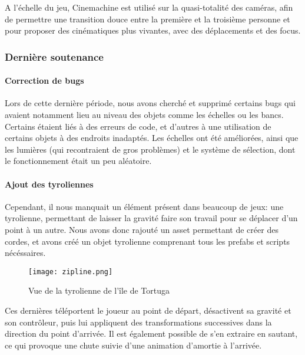 			A l'échelle du jeu, Cinemachine est utilisé sur la quasi-totalité des caméras, 
			afin de permettre une transition douce entre la première et la troisième personne et pour 
			proposer des cinématiques plus vivantes, avec des déplacements et des focus.


	\vspace{0.5cm}
	\subsubsection{Dernière soutenance}
	\vspace{0.5cm}

		\paragraph{Correction de bugs}
			
			Lors de cette dernière période, nous avons cherché et supprimé certains bugs qui avaient notamment lieu au niveau des objets comme les échelles ou les bancs. 
			Certains étaient liés à des erreurs de code, et d'autres à une utilisation de certains objets à des endroits inadaptés.
			Les échelles ont été améliorées, ainsi que les lumières (qui recontraient de gros problèmes) et le système de 
			sélection, dont le fonctionnement était un peu aléatoire.

		\paragraph{Ajout des tyroliennes}

			Cependant, il nous manquait un élément présent dans beaucoup de jeux: une tyrolienne, permettant de laisser la 
			gravité faire son travail pour se déplacer d'un point à un autre. Nous avons donc rajouté un asset permettant 
			de créer des cordes, et avons créé un objet tyrolienne comprenant tous les prefabs et scripts nécéssaires.

			\begin{figure}[hbt!]
				\centering
				\texttt{[image: zipline.png]}
				\caption{Vue de la tyrolienne de l'île de Tortuga}
			\end{figure}
			\FloatBarrier

			Ces dernières téléportent le joueur au point de départ, désactivent 
			sa gravité et son contrôleur, puis lui appliquent des transformations 
			successives dans la direction du point d'arrivée. Il est également possible 
			de s'en extraire en sautant, ce qui provoque une chute suivie d'une animation 
			d'amortie à l'arrivée.

